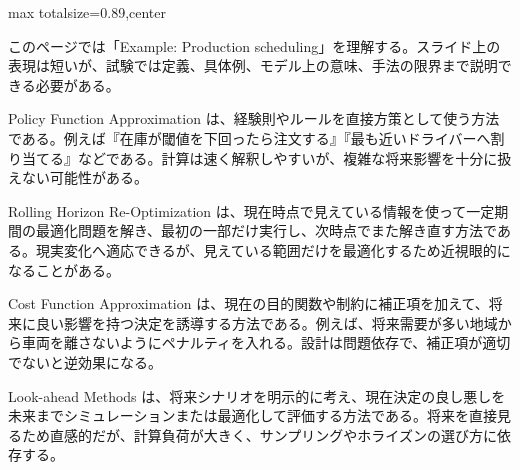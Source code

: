 \begin{minipage}[t]{0.58\textwidth}
\begin{adjustbox}{max totalsize={\textwidth}{0.89\textheight},center}
\begin{minipage}{\textwidth}\scriptsize
{}このページでは「Example: Production scheduling」を理解する。スライド上の表現は短いが、試験では定義、具体例、モデル上の意味、手法の限界まで説明できる必要がある。\par
Policy Function Approximation は、経験則やルールを直接方策として使う方法である。例えば『在庫が閾値を下回ったら注文する』『最も近いドライバーへ割り当てる』などである。計算は速く解釈しやすいが、複雑な将来影響を十分に扱えない可能性がある。\par
Rolling Horizon Re-Optimization は、現在時点で見えている情報を使って一定期間の最適化問題を解き、最初の一部だけ実行し、次時点でまた解き直す方法である。現実変化へ適応できるが、見えている範囲だけを最適化するため近視眼的になることがある。\par
Cost Function Approximation は、現在の目的関数や制約に補正項を加えて、将来に良い影響を持つ決定を誘導する方法である。例えば、将来需要が多い地域から車両を離さないようにペナルティを入れる。設計は問題依存で、補正項が適切でないと逆効果になる。\par
Look-ahead Methods は、将来シナリオを明示的に考え、現在決定の良し悪しを未来までシミュレーションまたは最適化して評価する方法である。将来を直接見るため直感的だが、計算負荷が大きく、サンプリングやホライズンの選び方に依存する。\par

\end{minipage}
\end{adjustbox}
\end{minipage}
